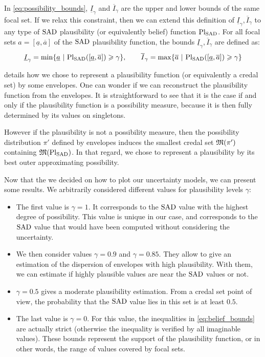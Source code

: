 In \cref{eq:possibility_bounds}, $\underline{I}_\gamma$ and $\overline{I}_\gamma$ are the upper and lower bounds of the same focal set. If we relax this constraint, then we can extend this definition of $\underline{I}_\gamma, \overline{I}_\gamma$ to any type of $\mathrm{SAD}$ plausibility (or equivalently belief) function $\mathrm{Pl}_{\mathrm{SAD}}$. For all focal sets $a=[\underline{a}, \overline{a}]$ of the $\mathrm{SAD}$ plausibility function, the bounds $\underline{I}_\gamma, \overline{I}_\gamma$ are defined as:
\begin{align}\label{eq:belief_bounds}
    \underline{I}_\gamma = \min\{\underline{a} ~|~ \mathrm{Pl}_{\mathrm{SAD}}([\underline{a}, \overline{a}])\geqslant\gamma\}, \qquad \overline{I}_\gamma = \max\{\overline{a} ~|~ \mathrm{Pl}_{\mathrm{SAD}}([\underline{a}, \overline{a}])\geqslant\gamma\}
\end{align}

\begin{remark}
     details how we chose to represent a plausibility function (or equivalently a credal set) by some envelopes. One can wonder if we can reconstruct the plausibility function from the envelopes. It is straightforward to see that it is the case if and only if the plausibility function is a possibility measure, because it is then fully determined by its values on singletons.
    
    However if the plausibility is not a possibility measure, then the possibility distribution $\pi'$ defined by envelopes induces the smallest credal set $\mathfrak{M}(\pi')$ containing $\mathfrak{M}(\mathrm{Pl}_{\mathrm{SAD}})$. In that regard, we chose to represent a plausibility by its best outer approximating possibility.
\end{remark}
Now that the we decided on how to plot our uncertainty models, we can present some results. We arbitrarily considered different values for plausibility levels $\gamma$:
\begin{itemize}
    \item The first value is $\gamma=1$. It corresponds to the $\mathrm{SAD}$ value with the highest degree of possibility. This value is unique in our case, and corresponds to the $\mathrm{SAD}$ value that would have been computed without considering the uncertainty.
    \item We then consider values $\gamma=0.9$ and $\gamma=0.85$. They allow to give an estimation of the dispersion of envelopes with high plausibility. With them, we can estimate if highly plausible values are near the $\mathrm{SAD}$ values or not.
    \item $\gamma=0.5$ gives a moderate plausibility estimation. From a credal set point of view, the probability that the $\mathrm{SAD}$ value lies in this set is at least $0.5$.
    \item The last value is $\gamma=0$. For this value, the inequalities in \cref{eq:belief_bounds} are actually strict (otherwise the inequality is verified by all imaginable values). These bounds represent the support of the plausibility function, or in other words, the range of values covered by focal sets.
\end{itemize}

